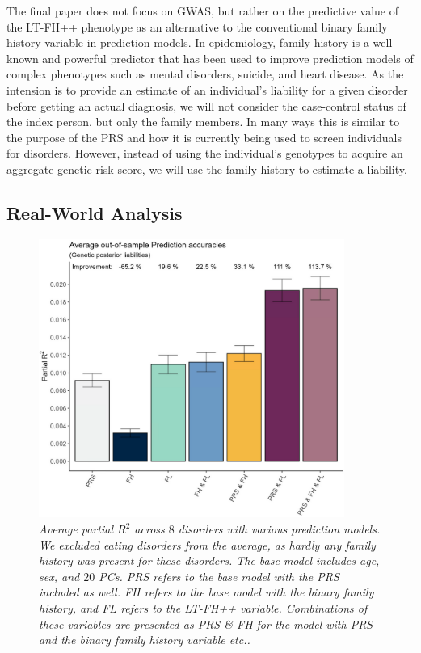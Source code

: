 The final paper does not focus on GWAS, but rather on the predictive value of the LT-FH++ phenotype as an alternative to the conventional binary family history variable in prediction models. In epidemiology, family history is a well-known and powerful predictor that has been used to improve prediction models of complex phenotypes such as mental disorders, suicide, and heart disease. As the intension is to provide an estimate of an individual's liability for a given disorder before getting an actual diagnosis, we will not consider the case-control status of the index person, but only the family members. In many ways this is similar to the purpose of the PRS and how it is currently being used to screen individuals for disorders. However, instead of using the individual's genotypes to acquire an aggregate genetic risk score, we will use the family history to estimate a liability. 

\subsection{Real-World Analysis}

\begin{figure}
	\includegraphics[width=10cm]{results/avg_partial_prediciton_accuracies_noED.png}
	\caption[Average out of sample prediction across $ 8 $ disorders]{
		\sl Average partial $ R^2 $ across $ 8 $ disorders with various prediction models. We excluded eating disorders from the average, as hardly any family history was present for these disorders. The base model includes age, sex, and $ 20 $ PCs. \textit{PRS} refers to the base model with the PRS included as well. \textit{FH} refers to the base model with the binary family history, and \textit{FL} refers to the LT-FH++ variable. Combinations of these variables are presented as \textit{PRS} \& \textit{FH} for the model with PRS and the binary family history variable etc..}
	\label{fig:paper3:predictionResults}
\end{figure}


